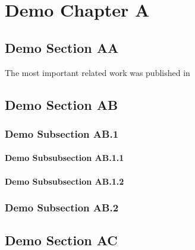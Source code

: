 

\chapter{Demo Chapter A}
\label{ch:ch2}


\section{Demo Section AA}
\label{sec:ds2A}
The most important related work was published in~\cite{demorefA:2000, demorefB:2001,demorefC:2002,demorefP:2003,demorefM:2004,demorefD:2005}

\blindtext


\section{Demo Section AB}
\label{sec:ds2B}
\blindtext

\subsection{Demo Subsection AB.1}
\label{sub:dss2B1}
\blindmathpaper

\subsubsection{Demo Subsubsection AB.1.1}
\label{sub:dss2B11}
\blindtext

\subsubsection{Demo Subsubsection AB.1.2}
\label{sub:dss2B12}
\blindtext

\subsection{Demo Subsection AB.2}
\label{sub:dss2B2}
\blindmathpaper


\section{Demo Section AC}
\label{sec:ds2C}
\blindmathpaper
